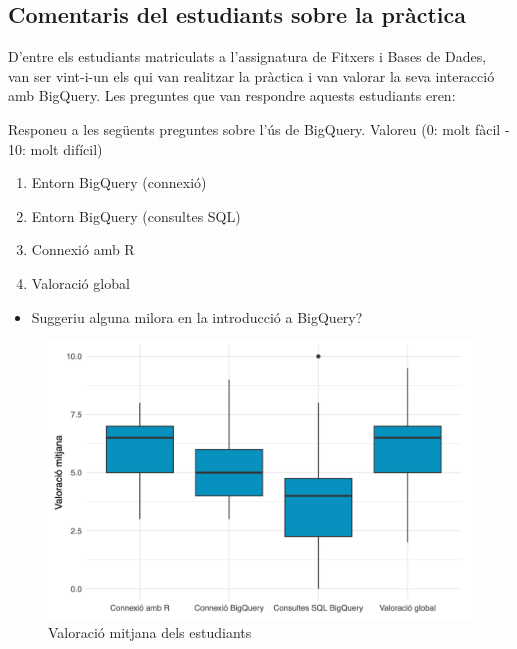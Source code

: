 \documentclass[12pt,longbibliography]{article}
\theoremstyle{definition}
\theoremstyle{remark}
\begin{document}
\subsection{Comentaris del estudiants sobre la pràctica}

D'entre els estudiants matriculats a l'assignatura de Fitxers i Bases de Dades, van ser vint-i-un els qui van realitzar la pràctica i van valorar la seva interacció amb BigQuery. Les preguntes que van respondre aquests estudiants eren:


Responeu a les següents preguntes sobre l'ús de BigQuery. Valoreu (0: molt fàcil - 10: molt difícil)


\begin{enumerate}

\item Entorn BigQuery (connexió)

\item Entorn BigQuery (consultes SQL)

\item Connexió amb R

\item Valoració global

\end{enumerate}

\begin{itemize}

\item Suggeriu alguna milora en la introducció a BigQuery?

\end{itemize}

\begin{figure}[h!]
\begin{center}
\includegraphics[width=13.5cm]{val}
\end{center}
\caption{Valoració mitjana dels estudiants}
\label{fig:val}
\end{figure}
\end{document}
